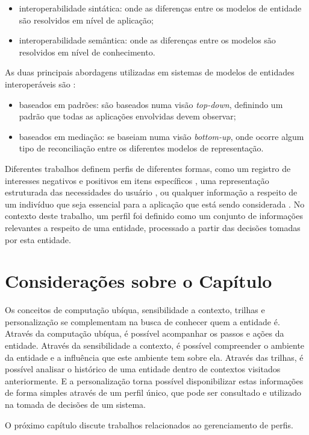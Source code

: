 \begin{itemize}

  \item interoperabilidade sintática: onde as diferenças entre os modelos de entidade são resolvidos em nível de aplicação;
  \item interoperabilidade semântica: onde as diferenças entre os modelos são resolvidos em nível de conhecimento.

\end{itemize}

As duas principais abordagens utilizadas em sistemas de modelos de entidades interoperáveis são \cite{viviani10}:

\begin{itemize}

  \item baseados em padrões: são baseados numa visão {\em top-down}, definindo um padrão que todas as aplicações envolvidas devem observar;
  \item baseados em mediação: se baseiam numa visão {\em bottom-up}, onde ocorre algum tipo de reconciliação entre os diferentes modelos de representação.

\end{itemize}

Diferentes trabalhos definem perfis de diferentes formas, como um registro de interesses negativos e positivos em itens específicos \cite{wasfi99}, uma representação estruturada das necessidades do usuário \cite{amato99}, ou qualquer informação a respeito de um indivíduo que seja essencial para a aplicação que está sendo considerada \cite{schiaffino09}. No contexto deste trabalho, um perfil foi definido como um conjunto de informações relevantes a respeito de uma entidade, processado a partir das decisões tomadas por esta entidade.



\section{Considerações sobre o Capítulo}

Os conceitos de computação ubíqua, sensibilidade a contexto, trilhas e personalização se complementam na busca de conhecer quem a entidade é. Através da computação ubíqua, é possível acompanhar os passos e ações da entidade. Através da sensibilidade a contexto, é possível compreender o ambiente da entidade e a influência que este ambiente tem sobre ela. Através das trilhas, é possível analisar o histórico de uma entidade dentro de contextos visitados anteriormente. E a personalização torna possível disponibilizar estas informações de forma simples através de um perfil único, que pode ser consultado e utilizado na tomada de decisões de um sistema.

O próximo capítulo discute trabalhos relacionados ao gerenciamento de perfis.
